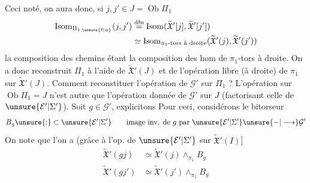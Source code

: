 Ceci noté, on aura donc, si $j,j'\in J=\operatorname{Ob}\Pi_1$
\[
\begin{aligned}
\operatorname{Isom}_{\Pi_{1,\unsure{\mathrm f|\phi}}}(j,j')&\overset{\mathrm{dfn}}{=}\operatorname{Isom}(\widetilde{\mathfrak X}'[j],\widetilde{\mathfrak X}'[j'])\\
&\simeq\operatorname{Isom}_{\pi_1\text{-tors à droite}}(\widetilde{\mathfrak X}'(j),\widetilde{\mathfrak X}'(j'))
\end{aligned}
\]
la composition des chemins étant la composition des hom de $\pi_1$-tors à droite.
 On a donc reconstruit  $\Pi_1$ à l'aide de $\widetilde{\mathfrak X}'(J)$ et de l'opération libre (à droite) de $\pi_1$ sur $\widetilde{\mathfrak X}'(J)$.
\deleted{[les opérations} Comment reconstituer l'opération de $\mathcal G'$ sur $\Pi_1$ ? L'opération sur $\operatorname{Ob}\Pi_1=J$ n'est autre que l'opération donnée de $\mathcal G'$ sur $J$ (factorisant celle de $\unsure{\mathcal E'|\Sigma'}$). Soit $g\in\mathcal G'$, explicitons
Pour ceci, considérons le bitorseur
\[
B_g\unsure{:}\subset\unsure{\mathcal E'|\Sigma'}\qquad\text{image inv. de }g\text{ par }\unsure{\mathcal E'|\Sigma'}\unsure{\mathbin{-}|\longrightarrow}\mathcal G'
\]
On note que l'on a (grâce à l'op. de $\unsure{\mathcal E'|\Sigma'}$ sur $\widetilde{\mathfrak X}'(I)$]
\[
\begin{aligned}
\widetilde{\mathfrak X}'(gj)&\simeq\widetilde{\mathfrak X}'(j)\mathbin{\wedge}_{\pi_1}B_g\\
\widetilde{\mathfrak X}'(gj')&\simeq\widetilde{\mathfrak X}'(j')\mathbin{\wedge}_{\pi_1}B_g
\end{aligned}
\]
